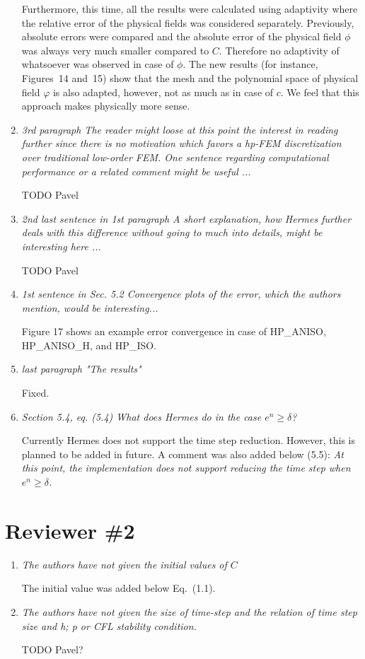 \documentclass[mathpazo]{cicp}
\begin{document}
\begin{enumerate}
Furthermore, this time, all the results were calculated using adaptivity where the relative error
of the physical fields was considered separately.  Previously, absolute errors were compared
and the absolute error of the physical field $\phi$ was always very  much smaller compared to
$C$. Therefore no adaptivity of whatsoever was observed in case of $\phi$. The new results
(for instance, Figures~14 and~15) show that the mesh and the polynomial
space of physical field $\varphi$ is also adapted, however, not as much as in case of $c$.
We feel that this approach makes physically more sense.

\item \emph{3rd paragraph The reader might loose at this point the interest in reading further since there
is no motivation which favors a hp-FEM discretization over traditional low-order FEM. One
sentence regarding computational performance or a related comment might be useful ...}

TODO Pavel

\item \emph{2nd last sentence in 1st paragraph A short explanation, how Hermes further deals with this
difference without going to much into details, might be interesting here ...}

TODO Pavel

\item \emph{1st sentence in Sec. 5.2 Convergence plots of the error, which the authors mention, would be interesting...}

Figure 17 shows an example error convergence in case of HP\_ANISO, HP\_ANISO\_H, and HP\_ISO.

\item \emph{last paragraph "The results"}

Fixed.

\item \emph{Section 5.4, eq. (5.4) What does Hermes do in the case $e^n\geq\delta$?}

Currently Hermes does not support the time step reduction. However, this is planned to be added
in future. A comment was also added below (5.5): \emph{At this point,
the implementation does not support reducing the time step when $e^n \geq \delta$.}

\end{enumerate}

\section{Reviewer \#2}

\begin{enumerate}

\item \emph{The authors have not given the initial values of $C$}

The initial value was added below Eq.~(1.1).

\item \emph{The authors have not given the size of time-step and the relation
of time step size and h; p or CFL stability condition.}

TODO Pavel?

\end{enumerate}
\end{document}
